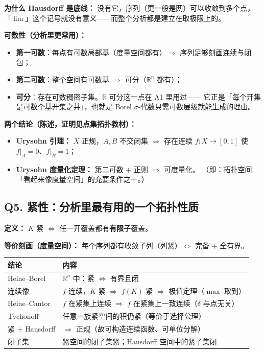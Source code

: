 \textbf{为什么 Hausdorff 是底线：} 没有它，序列（更一般是网）可以收敛到多个点，
「$\lim$」这个记号就没有意义——而整个分析都是建立在取极限上的。

\textbf{可数性（分析里更常用）：}
\begin{itemize}
  \item \textbf{第一可数}：每点有可数局部基（度量空间都有）$\Rightarrow$ 序列足够刻画连续与闭包；
  \item \textbf{第二可数}：整个空间有可数基 $\Rightarrow$ 可分（$\mathbb R^n$ 都有）；
  \item \textbf{可分}：存在可数稠密子集。$\mathbb R$ 可分这一点在 A1 里用过——
        它正是「每个开集是可数个基开集之并」，也就是 Borel $\sigma$-代数只需可数层级就能生成的理由。
\end{itemize}

\textbf{两个结论（陈述，证明见点集拓扑教材）：}
\begin{itemize}
  \item \textbf{Urysohn 引理：} $X$ 正规，$A,B$ 不交闭集 $\Longrightarrow$ 存在连续 $f:X\to[0,1]$ 使 $f|_A=0$、$f|_B=1$；
  \item \textbf{Urysohn 度量化定理：} 第二可数 $+$ 正则 $\Longrightarrow$ 可度量化。
        （即：拓扑空间「看起来像度量空间」的充要条件之一。）
\end{itemize}

\subsection{Q5. 紧性：分析里最有用的一个拓扑性质}

\textbf{定义：} $K$ 紧 $\iff$ 任一开覆盖都有\textbf{有限}子覆盖。

\textbf{等价刻画（度量空间）：} 每个序列都有收敛子列（列紧）$\iff$ 完备 $+$ 全有界。

\begin{center}
\begin{tabular}{L{4.0cm}L{10.6cm}}
\toprule
\textbf{结论} & \textbf{内容} \\
\midrule
Heine--Borel & $\mathbb R^n$ 中：紧 $\iff$ 有界且闭 \\
连续像 & $f$ 连续，$K$ 紧 $\Longrightarrow$ $f(K)$ 紧 $\Rightarrow$ 极值定理（$\max$ 取到） \\
Heine--Cantor & $f$ 在紧集上连续 $\Longrightarrow$ $f$ 在紧集上一致连续（$\delta$ 与点无关） \\
Tychonoff & 任意一族紧空间的积仍紧（等价于选择公理） \\
紧 $+$ Hausdorff & $\Longrightarrow$ 正规（故可构造连续函数、可单位分解） \\
闭子集 & 紧空间的闭子集紧；Hausdorff 空间中的紧子集闭 \\
\bottomrule
\end{tabular}
\end{center}


